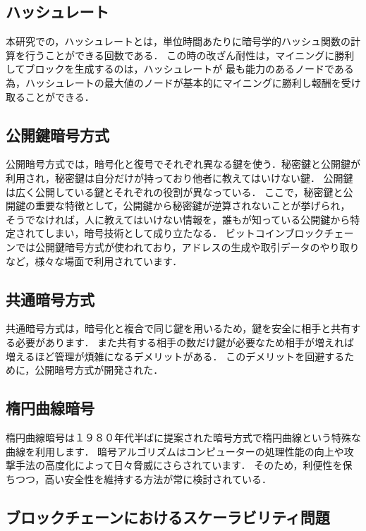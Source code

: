\documentclass[a4paper,12pt]{jsarticle}
\begin{document}
      \subsection*{ハッシュレート}
本研究での，ハッシュレートとは，単位時間あたりに暗号学的ハッシュ関数の計算を行うことができる回数である．
この時の改ざん耐性は，マイニングに勝利してブロックを生成するのは，ハッシュレートが
最も能力のあるノードである為，ハッシュレートの最大値のノードが基本的にマイニングに勝利し報酬を受け取ることができる．

      \subsection*{公開鍵暗号方式}

公開暗号方式では，暗号化と復号でそれぞれ異なる鍵を使う．秘密鍵と公開鍵が利用され，秘密鍵は自分だけが持っており他者に教えてはいけない鍵．
公開鍵は広く公開している鍵とそれぞれの役割が異なっている．
ここで，秘密鍵と公開鍵の重要な特徴として，公開鍵から秘密鍵が逆算されないことが挙げられ，
そうでなければ，人に教えてはいけない情報を，誰もが知っている公開鍵から特定されてしまい，暗号技術として成り立たなる．
ビットコインブロックチェーンでは公開鍵暗号方式が使われており，アドレスの生成や取引データのやり取りなど，様々な場面で利用されています．

      \subsection*{共通暗号方式}
共通暗号方式は，暗号化と複合で同じ鍵を用いるため，鍵を安全に相手と共有する必要があります．
また共有する相手の数だけ鍵が必要なため相手が増えれば増えるほど管理が煩雑になるデメリットがある．
このデメリットを回避するために，公開暗号方式が開発された．

      \subsection*{楕円曲線暗号}
楕円曲線暗号は１９８０年代半ばに提案された暗号方式で楕円曲線という特殊な曲線を利用します．
暗号アルゴリズムはコンピューターの処理性能の向上や攻撃手法の高度化によって日々脅威にさらされています．
そのため，利便性を保ちつつ，高い安全性を維持する方法が常に検討されている．

      \subsection{ブロックチェーンにおけるスケーラビリティ問題}
\end{document}
